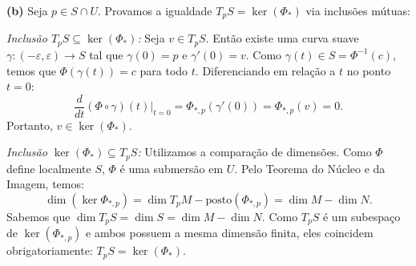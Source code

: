 {	\textbf{(b)} Seja $p \in S \cap U$. Provamos a igualdade $T_p S = \ker(\Phi_*)$ via inclusões mútuas:
	
	\textit{Inclusão $T_p S \subseteq \ker(\Phi_*)$:} Seja $v \in T_p S$. Então existe uma curva suave $\gamma : (-\varepsilon, \varepsilon) \to S$ tal que $\gamma(0) = p$ e $\gamma'(0) = v$. Como $\gamma(t) \in S = \Phi^{-1}(c)$, temos que $\Phi(\gamma(t)) = c$ para todo $t$. Diferenciando em relação a $t$ no ponto $t=0$:
	\begin{equation*}
		\frac{d}{dt} (\Phi \circ \gamma)(t) \Big|_{t=0} = \Phi_{*,p}(\gamma'(0)) = \Phi_{*,p}(v) = 0.
	\end{equation*}
	Portanto, $v \in \ker(\Phi_*)$.
	
	\textit{Inclusão $\ker(\Phi_*) \subseteq T_p S$:} Utilizamos a comparação de dimensões. Como $\Phi$ define localmente $S$, $\Phi$ é uma submersão em $U$. Pelo Teorema do Núcleo e da Imagem, temos:
	\begin{equation*}
		\dim(\ker \Phi_{*,p}) = \dim T_p M - \text{posto}(\Phi_{*,p}) = \dim M - \dim N.
	\end{equation*}
	Sabemos que $\dim T_p S = \dim S = \dim M - \dim N$. Como $T_p S$ é um subespaço de $\ker(\Phi_{*,p})$ e ambos possuem a mesma dimensão finita, eles coincidem obrigatoriamente: $T_p S = \ker(\Phi_*)$.
}


